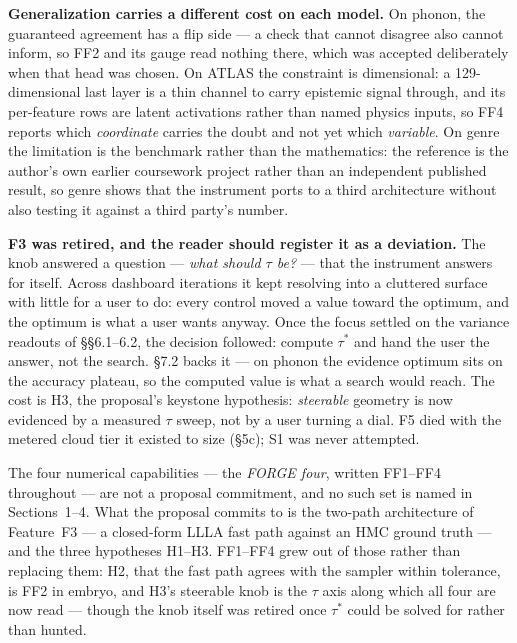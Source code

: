 \documentclass[11pt]{article}
\begin{document}
\textbf{Generalization carries a different cost on each model.} On phonon, the
guaranteed agreement has a flip side --- a check that cannot disagree also
cannot inform, so FF2 and its gauge read nothing there, which was accepted
deliberately when that head was chosen. On ATLAS the constraint is dimensional:
a 129-dimensional last layer is a thin channel to carry epistemic signal
through, and its per-feature rows are latent activations rather than named
physics inputs, so FF4 reports which \emph{coordinate} carries the doubt and not
yet which \emph{variable}. On genre the limitation is the benchmark rather than
the mathematics: the reference is the author's own earlier coursework project
rather than an independent published result, so genre shows that the instrument
ports to a third architecture without also testing it against a third party's
number.

\textbf{F3 was retired, and the reader should register it as a deviation.} The
knob answered a question --- \emph{what should $\tau$ be?} --- that the
instrument answers for itself. Across dashboard iterations it kept resolving
into a cluttered surface with little for a user to do: every control moved a
value toward the optimum, and the optimum is what a user wants anyway. Once the
focus settled on the variance readouts of \S\S6.1--6.2, the decision followed:
compute $\tau^{*}$ and hand the user the answer, not the search. \S7.2 backs it
--- on phonon the evidence optimum sits on the accuracy plateau, so the computed
value is what a search would reach. The cost is H3, the proposal's keystone
hypothesis: \emph{steerable} geometry is now evidenced by a measured $\tau$
sweep, not by a user turning a dial. F5 died with the metered cloud tier it
existed to size (\S5c); S1 was never attempted.


The four numerical capabilities --- the \emph{FORGE four}, written FF1--FF4
throughout --- are not a proposal commitment, and no such set is named in
Sections~1--4. What the proposal commits to is the two-path architecture of
Feature~F3 --- a closed-form LLLA fast path against an HMC ground truth --- and
the three hypotheses H1--H3. FF1--FF4 grew out of those
rather than replacing them: H2, that the fast path agrees with the sampler
within tolerance, is FF2 in embryo, and H3's steerable knob is the $\tau$ axis
along which all four are now read --- though the knob itself was retired once
$\tau^{*}$ could be solved for rather than hunted.
\end{document}
